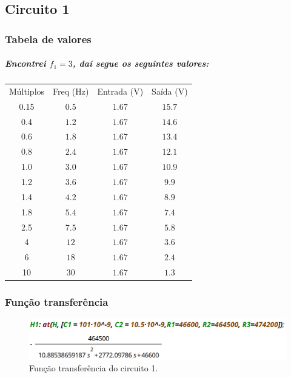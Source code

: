 \documentclass[12pt,twoside, a4paper, twocolumn]{article}
\begin{document}
\subsection{Circuito 1}


\subsubsection{Tabela de valores}


\subparagraph*{Encontrei $f_1 = 3$, daí segue os seguintes valores:}


\begin{center}
    \begin{tabular}{ |c|c|c|c| }
        \hline
        Múltiplos & Freq (Hz) & Entrada (V) & Saída (V) \\
        0.15      & $0.5$     & $1.67$      & $15.7$    \\
        0.4       & $1.2$     & $1.67$      & $14.6$    \\
        0.6       & $1.8$     & $1.67$      & $13.4$    \\
        0.8       & $2.4$     & $1.67$      & $12.1$    \\
        1.0       & $3.0$     & $1.67$      & $10.9$    \\
        1.2       & $3.6$     & $1.67$      & $9.9$     \\
        1.4       & $4.2$     & $1.67$      & $8.9$     \\
        1.8       & $5.4$     & $1.67$      & $7.4$     \\
        2.5       & $7.5$     & $1.67$      & $5.8$     \\
        4         & $12$      & $1.67$      & $3.6$     \\
        6         & $18$      & $1.67$      & $2.4$     \\
        10        & $30$      & $1.67$      & $1.3$     \\
        \hline
    \end{tabular}
\end{center}


\subsubsection{Função transferência}


\begin{figure}[h]
    \centering
    \includegraphics[width=1\columnwidth]{images/H1valoresreais.png}
    \caption{Função transferência do circuito 1.}
\end{figure}
\end{document}
